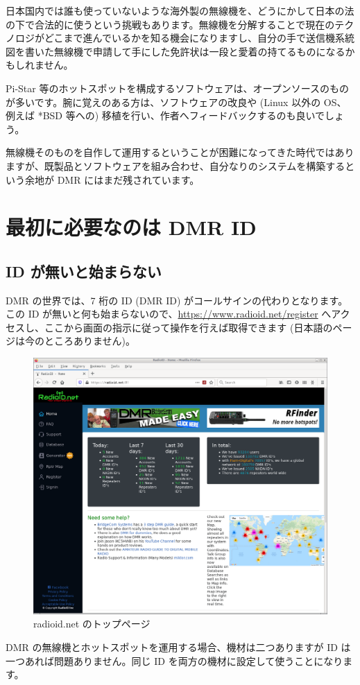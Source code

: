 \documentclass[a4j,oneside]{ujbook}
\begin{document}
日本国内では誰も使っていないような海外製の無線機を、どうにかして日本の法の下で合法的に使うという挑戦もあります。無線機を分解することで現在のテクノロジがどこまで進んでいるかを知る機会になりますし、自分の手で送信機系統図を書いた無線機で申請して手にした免許状は一段と愛着の持てるものになるかもしれません。

Pi-Star 等のホットスポットを構成するソフトウェアは、オープンソースのものが多いです。腕に覚えのある方は、ソフトウェアの改良や (Linux 以外の OS、例えば *BSD 等への) 移植を行い、作者へフィードバックするのも良いでしょう。

無線機そのものを自作して運用するということが困難になってきた時代ではありますが、既製品とソフトウェアを組み合わせ、自分なりのシステムを構築するという余地が DMR にはまだ残されています。

\chapter{最初に必要なのは DMR ID}

\section{ID が無いと始まらない}

DMR の世界では、7 桁の ID (DMR ID) がコールサインの代わりとなります。この ID が無いと何も始まらないので、\url{https://www.radioid.net/register} へアクセスし、ここから画面の指示に従って操作を行えば取得できます (日本語のページは今のところありません)。
\begin{figure}[H]
 \centering
 \includegraphics[width=15cm]{img/radioid_net2.png}
 \caption{radioid.net のトップページ}
\end{figure}
DMR の無線機とホットスポットを運用する場合、機材は二つありますが ID は一つあれば問題ありません。同じ ID を両方の機材に設定して使うことになります。
\end{document}
